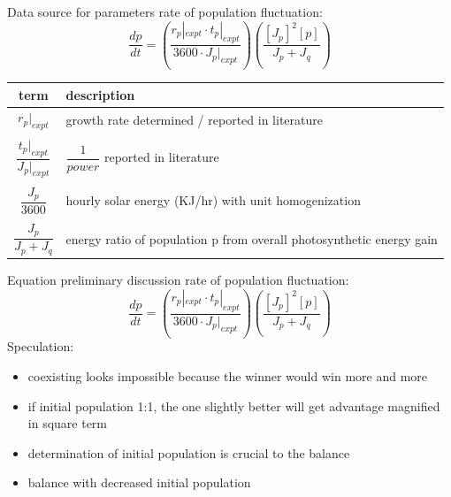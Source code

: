 \documentclass[xcolor=x11names,compress]{beamer}
\begin{document}
\begin{frame}{Data source for parameters}
    rate of population fluctuation:
    \begin{equation*}
        \dfrac{dp}{dt} = (\dfrac{r_p|_{expt}\cdot t_p|_{expt}}{3600\cdot J_p|_{expt}})(\dfrac{[J_p]^2 [p]}{J_p + J_q})
    \end{equation*}
    \begin{longtable}{c|p{.8\linewidth}}
        term & description \\\hline
        $r_p|_{expt}$ & growth rate determined / reported in literature \\&\\
        $\dfrac{t_p|_{expt}}{J_p|_{expt}}$ & $\dfrac{1}{power}$ reported in literature \\&\\
        $\dfrac{J_p}{3600}$ & hourly solar energy (KJ/hr) with unit homogenization \\&\\
        $\dfrac{J_p}{J_p + J_q}$ & energy ratio of population p from overall photosynthetic energy gain
    \end{longtable}
\end{frame}

\begin{frame}{Equation preliminary discussion}
    rate of population fluctuation:
    \begin{equation*}
        \dfrac{dp}{dt} = (\dfrac{r_p|_{expt}\cdot t_p|_{expt}}{3600\cdot J_p|_{expt}})(\dfrac{[J_p]^2 [p]}{J_p + J_q})
    \end{equation*}
    Speculation:
    \begin{itemize}\itemsep10pt
        \item coexisting looks impossible because the winner would win more and more
        \item if initial population 1:1, the one slightly better will get advantage magnified in square term
        \item determination of initial population is crucial to the balance
        \item balance with decreased initial population
    \end{itemize}
\end{frame}
\end{document}
